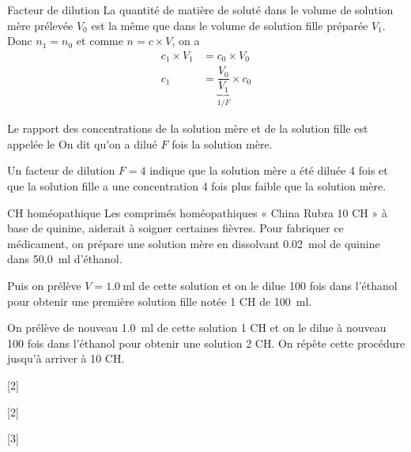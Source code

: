 \begin{doc}{Facteur de dilution}
  La quantité de matière de soluté dans le volume de solution mère prélevée $V_0$ est la même que dans le volume de solution fille préparée $V_1$. Donc $n_1 = n_0$ et comme $n = c \times V$, on a
  \begin{align*}
    c_1 \times V_1 &= c_0 \times V_0 \\
    c_1 &= \underbrace{\dfrac{V_0}{V_1}}_{1/F} \times c_0
  \end{align*}

  \begin{importants}  
    Le rapport des concentrations de la solution mère et de la solution fille est appelée le 
    On dit qu'on a dilué $F$ fois la solution mère.
  \end{importants}
  \exemple Un facteur de dilution $F = 4$ indique que la solution mère a été diluée 4 fois et que la solution fille a une concentration 4 fois plus faible que la solution mère.
\end{doc}

\begin{doc}{CH homéopathique}
  Les comprimés homéopathiques « China Rubra 10 CH » à base de quinine, aiderait à soigner certaines fièvres.
  Pour fabriquer ce médicament, on prépare une solution mère en dissolvant \qty{0,02}{\mole} de quinine %
  dans \qty{50,0}{\ml} d’éthanol.
  
  Puis on prélève $V = \qty{1,0}{\ml}$ de cette solution et on le dilue 100 fois dans l’éthanol pour obtenir une première solution fille notée 1 CH de \qty{100}{\ml}.
  
  On prélève de nouveau \qty{1,0}{\ml} de cette solution 1 CH et on le dilue à nouveau 100 fois dans l'éthanol pour obtenir une solution 2 CH.
  On répète cette procédure jusqu'à arriver à 10 CH.
\end{doc}

[2]

[2]

[3]
